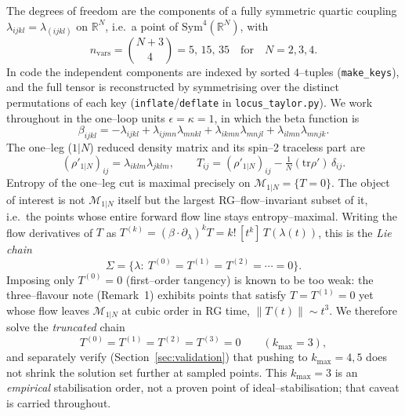 \documentclass[11pt]{article}
\newcommand{\Sym}{\mathrm{Sym}}
\newcommand{\tr}{\mathrm{tr}}
\newcommand{\norm}[1]{\lVert #1\rVert}
\newcommand{\code}[1]{\texttt{#1}}
\begin{document}
The degrees of freedom are the components of a fully symmetric quartic coupling
$\lambda_{ijkl}=\lambda_{(ijkl)}$ on $\mathbb R^N$, i.e.\ a point of
$\Sym^4(\mathbb R^N)$, with
\[
n_{\mathrm{vars}}=\binom{N+3}{4}=5,\,15,\,35 \quad\text{for}\quad N=2,3,4.
\]
In code the independent components are indexed by sorted $4$--tuples
(\code{make\_keys}), and the full tensor is reconstructed by symmetrising over
the distinct permutations of each key (\code{inflate}/\code{deflate} in
\code{locus\_taylor.py}). We work throughout in the one--loop units
$\epsilon=\kappa=1$, in which the beta function is
\begin{equation}
\beta_{ijkl}=-\lambda_{ijkl}
 +\lambda_{ijmn}\lambda_{mnkl}
 +\lambda_{ikmn}\lambda_{mnjl}
 +\lambda_{ilmn}\lambda_{mnjk}.
\label{eq:beta}
\end{equation}
The one--leg ($1|N$) reduced density matrix and its spin--2 traceless part are
\begin{equation}
(\rho'_{1|N})_{ij}=\lambda_{iklm}\lambda_{jklm},\qquad
T_{ij}=(\rho'_{1|N})_{ij}-\tfrac1N(\tr\rho')\,\delta_{ij}.
\label{eq:T}
\end{equation}
Entropy of the one--leg cut is maximal precisely on $\mathcal M_{1|N}=\{T=0\}$.
The object of interest is not $\mathcal M_{1|N}$ itself but the largest
RG--flow--invariant subset of it, i.e.\ the points whose entire forward flow
line stays entropy--maximal. Writing the flow derivatives of $T$ as
$T^{(k)}=(\beta\!\cdot\!\partial_\lambda)^k T = k!\,[t^k]\,T(\lambda(t))$, this is
the \emph{Lie chain}
\begin{equation}
\Sigma=\bigl\{\lambda:\ T^{(0)}=T^{(1)}=T^{(2)}=\cdots=0\bigr\}.
\label{eq:Sigma}
\end{equation}
Imposing only $T^{(0)}=0$ (first--order tangency) is known to be too weak: the
three--flavour note (Remark~1) exhibits points that satisfy $T=T^{(1)}=0$ yet
whose flow leaves $\mathcal M_{1|N}$ at cubic order in RG time,
$\norm{T(t)}\sim t^3$. We therefore solve the \emph{truncated} chain
\begin{equation}
T^{(0)}=T^{(1)}=T^{(2)}=T^{(3)}=0\qquad(k_{\max}=3),
\label{eq:chain}
\end{equation}
and separately verify (Section~\ref{sec:validation}) that pushing to
$k_{\max}=4,5$ does not shrink the solution set further at sampled points. This
$k_{\max}=3$ is an \emph{empirical} stabilisation order, not a proven point of
ideal--stabilisation; that caveat is carried throughout.
\end{document}
